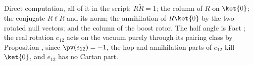 Direct computation, all of it in the script: $R\tilde R = 1$; the column of $R$ on $\ket{0}$; the conjugate $R\ell\tilde R$ and its norm; the annihilation of $R\ket{0}$ by the two rotated null vectors; and the column of the boost rotor. The half angle is Fact ; the real rotation $e_{12}$ acts on the vacuum purely through its pairing class by Proposition , since $\pv(e_{12}) = -1$, the hop and annihilation parts of $e_{12}$ kill $\ket{0}$, and $e_{12}$ has no Cartan part.
